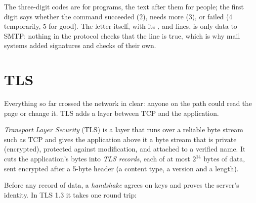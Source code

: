 The three-digit codes are for programs, the text after them for people; the first digit says whether the command
succeeded (2), needs more (3), or failed (4 temporarily, 5 for good). The letter itself, with its ,
 and  lines, is only data to SMTP: nothing in the protocol checks that the  line is
true, which is why mail systems added signatures and checks of their own.

\section{TLS}\label{sec:b2:application-layer:tls}

Everything so far crossed the network in clear: anyone on the path could read the page or change it. TLS adds a
layer between TCP and the application.

\begin{definition}\label{def:b2:application-layer:tls}
\emph{Transport Layer Security} (TLS) is a layer that runs over a reliable byte stream
such as TCP and gives the application above it a byte stream that is private (encrypted), protected against
modification, and attached to a verified name. It cuts the application's bytes into \emph{TLS
records}, each of at most $2^{14}$ bytes of data, sent encrypted after a 5-byte header (a content
type, a version and a length).
\end{definition}

Before any record of data, a \emph{handshake} agrees on keys and proves the server's identity. In TLS 1.3 it takes one
round trip:

\begin{omfigure}
\par{}
\end{omfigure}

